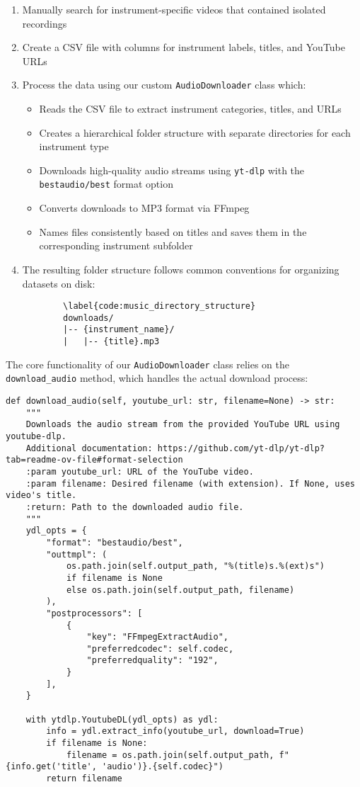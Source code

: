 \begin{enumerate}
    \item Manually search for instrument-specific videos that contained isolated recordings
    \item Create a CSV file with columns for instrument labels, titles, and YouTube URLs
    \item Process the data using our custom \texttt{AudioDownloader} class which:
        \begin{itemize}
            \item Reads the CSV file to extract instrument categories, titles, and URLs
            \item Creates a hierarchical folder structure with separate directories for each instrument type
            \item Downloads high-quality audio streams using \texttt{yt-dlp} with the \texttt{bestaudio/best} format option
            \item Converts downloads to MP3 format via FFmpeg
            \item Names files consistently based on titles and saves them in the corresponding instrument subfolder
        \end{itemize}
    \item The resulting folder structure follows common conventions for organizing datasets on disk:
        \begin{verbatim}
        \label{code:music_directory_structure}
        downloads/
        |-- {instrument_name}/
        |   |-- {title}.mp3
        \end{verbatim}
\end{enumerate}

The core functionality of our \texttt{AudioDownloader} class relies on the \texttt{download\_audio} method, which handles the actual download process:

\begin{lstlisting}[caption=AudioDownloader's download\_audio method]
def download_audio(self, youtube_url: str, filename=None) -> str:
    """
    Downloads the audio stream from the provided YouTube URL using youtube-dlp.
    Additional documentation: https://github.com/yt-dlp/yt-dlp?tab=readme-ov-file#format-selection
    :param youtube_url: URL of the YouTube video.
    :param filename: Desired filename (with extension). If None, uses video's title.
    :return: Path to the downloaded audio file.
    """
    ydl_opts = {
        "format": "bestaudio/best",
        "outtmpl": (
            os.path.join(self.output_path, "%(title)s.%(ext)s")
            if filename is None
            else os.path.join(self.output_path, filename)
        ),
        "postprocessors": [
            {
                "key": "FFmpegExtractAudio",
                "preferredcodec": self.codec,
                "preferredquality": "192",
            }
        ],
    }

    with ytdlp.YoutubeDL(ydl_opts) as ydl:
        info = ydl.extract_info(youtube_url, download=True)
        if filename is None:
            filename = os.path.join(self.output_path, f"{info.get('title', 'audio')}.{self.codec}")
        return filename
\end{lstlisting}

